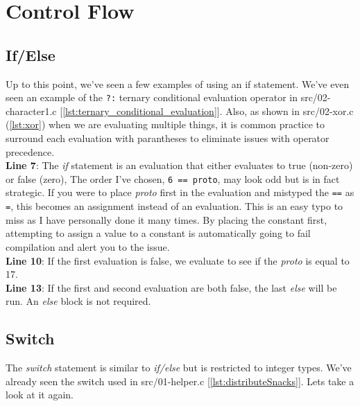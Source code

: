 \documentclass[../main.tex]{subfiles}
\begin{document}
	
	\chapter{Control Flow}
	
	\section{If/Else}
	
	Up to this point, we've seen a few examples of using an if statement.  We've even seen an example of the \texttt{?:} ternary conditional evaluation operator in src/02-character1.c [\ref{lst:ternary_conditional_evaluation}].  Also, as shown in src/02-xor.c (\ref{lst:xor}) when we are evaluating multiple things, it is common practice to surround each evaluation with parantheses\cite{embedded_c} to eliminate issues with operator precedence.\\
	
	
	
	\textbf{Line 7}: The \textit{if} statement is an evaluation that either evaluates to true (non-zero) or false (zero), The order I've chosen, \texttt{6 == proto}, may look odd but is in fact strategic.  If you were to place \textit{proto} first in the evaluation and mistyped the \texttt{==} as \texttt{=}, this becomes an assignment instead of an evaluation.  This is an easy typo to miss as I have personally done it many times.  By placing the constant first, attempting to assign a value to a constant is automatically going to fail compilation and alert you to the issue. \\
	\textbf{Line 10}: If the first evaluation is false, we evaluate to see if the \textit{proto} is equal to 17. \\
	\textbf{Line 13}: If the first and second evaluation are both false, the last \textit{else} will be run.  An \textit{else} block is not required.\\
	
	\section{Switch}
	The \textit{switch} statement is similar to \textit{if/else} but is restricted to integer types.  We've already seen the switch used in src/01-helper.c [\ref{lst:distributeSnacks}].  Lets take a look at it again.\\
\end{document}
